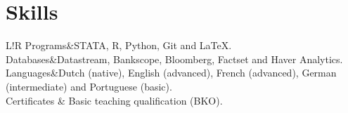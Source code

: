 \documentclass[9pt]{article}
\newcommand\VRule{\color{lightgray}\vrule width 0.5pt}
\begin{document}
\section*{Skills}
\begin{tabular}{L!{\VRule}R}
	Programs&STATA, R, Python, Git and {\LaTeX}. \\[2pt]
	Databases&Datastream, Bankscope, Bloomberg, Factset and Haver Analytics. \\[2pt]
	Languages&Dutch (native), English (advanced), French (advanced), German (intermediate) and Portuguese (basic). \\[2pt]
	Certificates & Basic teaching qualification (BKO). 
\end{tabular}




 
\end{document}
